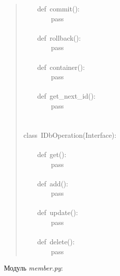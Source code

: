 \documentclass[14pt,a4paper,openany,twoside,final]{extbook}
\providecommand*{\DUroletitlereference}[1]{\textsl{#1}}
\begin{document}
\begin{quote}
{~~~~def~commit():\\
~~~~~~~~pass\\
~\\
~~~~def~rollback():\\
~~~~~~~~pass\\
~\\
~~~~def~container():\\
~~~~~~~~pass\\
~\\
~~~~def~get\_next\_id():\\
~~~~~~~~pass\\
~\\
~\\
class~IDbOperation(Interface):\\
~\\
~~~~def~get():\\
~~~~~~~~pass\\
~\\
~~~~def~add():\\
~~~~~~~~pass\\
~\\
~~~~def~update():\\
~~~~~~~~pass\\
~\\
~~~~def~delete():\\
~~~~~~~~pass
}
\end{quote}

Модуль \DUroletitlereference{member.py}:
\end{document}
